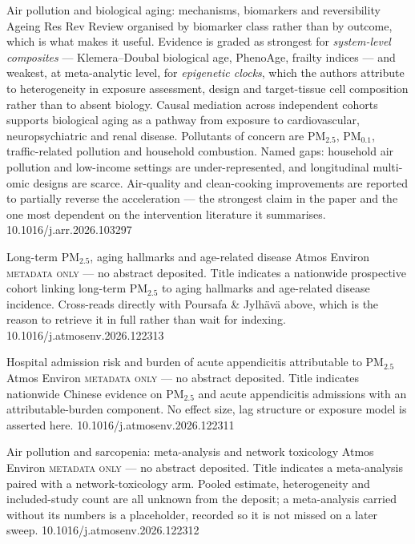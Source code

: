 \documentclass[10pt]{article}
\begin{document}
{Air pollution and biological aging: mechanisms, biomarkers and reversibility}
{Ageing Res Rev}
{Review organised by biomarker class rather than by outcome, which is what makes it useful.
Evidence is graded as strongest for \emph{system-level composites} --- Klemera--Doubal
biological age, PhenoAge, frailty indices --- and weakest, at meta-analytic level, for
\emph{epigenetic clocks}, which the authors attribute to heterogeneity in exposure assessment,
design and target-tissue cell composition rather than to absent biology. Causal mediation
across independent cohorts supports biological aging as a pathway from exposure to
cardiovascular, neuropsychiatric and renal disease. Pollutants of concern are PM$_{2.5}$,
PM$_{0.1}$, traffic-related pollution and household combustion. Named gaps: household air
pollution and low-income settings are under-represented, and longitudinal multi-omic designs
are scarce. Air-quality and clean-cooking improvements are reported to partially reverse the
acceleration --- the strongest claim in the paper and the one most dependent on the
intervention literature it summarises.}
{10.1016/j.arr.2026.103297}

{Long-term PM$_{2.5}$, aging hallmarks and age-related disease}
{Atmos Environ}
{\textsc{metadata only} --- no abstract deposited. Title indicates a nationwide prospective
cohort linking long-term PM$_{2.5}$ to aging hallmarks and age-related disease incidence.
Cross-reads directly with Poursafa \& Jylh\"av\"a above, which is the reason to retrieve it
in full rather than wait for indexing.}
{10.1016/j.atmosenv.2026.122313}

{Hospital admission risk and burden of acute appendicitis attributable to PM$_{2.5}$}
{Atmos Environ}
{\textsc{metadata only} --- no abstract deposited. Title indicates nationwide Chinese
evidence on PM$_{2.5}$ and acute appendicitis admissions with an attributable-burden
component. No effect size, lag structure or exposure model is asserted here.}
{10.1016/j.atmosenv.2026.122311}

{Air pollution and sarcopenia: meta-analysis and network toxicology}
{Atmos Environ}
{\textsc{metadata only} --- no abstract deposited. Title indicates a meta-analysis paired
with a network-toxicology arm. Pooled estimate, heterogeneity and included-study count are
all unknown from the deposit; a meta-analysis carried without its numbers is a placeholder,
recorded so it is not missed on a later sweep.}
{10.1016/j.atmosenv.2026.122312}
\end{document}
